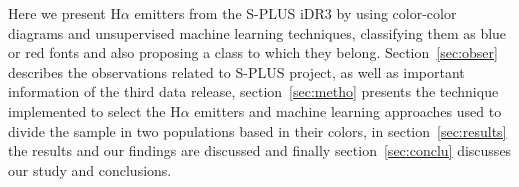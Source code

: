 \documentclass[fleqn,usenatbib]{mnras}
\newcommand{\comment}[1]{\textcolor{red}{#1}}
\begin{document}


Here we present H$\alpha$ emitters from the S-PLUS iDR3 by using color-color diagrams and unsupervised machine learning techniques, classifying them as blue or red fonts and also proposing a class to which they belong. Section~\ref{sec:obser} describes
the observations related to S-PLUS project, as well as important information of 
the third data release, section~\ref{sec:metho} presents the technique implemented 
to select the H{$\alpha$} emitters and machine learning approaches used to divide 
the sample in two populations based in their colors, in section~\ref{sec:results}  
the results and our findings are discussed and finally section~\ref{sec:conclu} 
discusses our study and conclusions.
\end{document}
